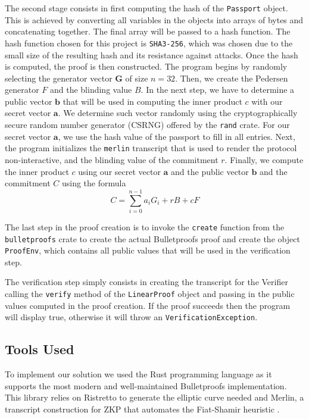 \documentclass[sigconf,screen,nonacm]{acmart}
\begin{document}
  The second stage consists in first computing the hash of the \texttt{Passport}
  object. This is achieved by converting all variables in the objects into arrays
  of bytes and concatenating together. The final array will be passed to a hash
  function. The hash function chosen for this project is \texttt{SHA3-256}, which
  was chosen due to the small size of the resulting hash and its resistance against
  attacks. Once the hash is computed, the proof is then constructed. The program
  begins by randomly selecting the generator vector $\mathbf{G}$ of size $n = 32$.
  Then, we create the Pedersen generator $F$ and the blinding value $B$. In the next
  step, we have to determine a public vector $\mathbf{b}$ that will be used in
  computing the inner product $c$ with our secret vector $\mathbf{a}$. We determine
  such vector randomly using the cryptographically secure random number generator
  (CSRNG) offered by the \texttt{rand} crate. For our secret vector $\mathbf{a}$,
  we use the hash value of the passport to fill in all entries. Next, the program
  initializes the \texttt{merlin} transcript that is used to render the protocol
  non-interactive, and the blinding value of the commitment $r$. Finally, we compute
  the inner product $c$ using our secret vector $\mathbf{a}$ and the public vector
  $\mathbf{b}$ and the commitment $C$ using the formula
  \begin{equation}
    C = \sum_{i=0}^{n-1} a_iG_i + rB + cF
  \end{equation}

  The last step in the proof creation is to invoke the \texttt{create} function
  from the \texttt{bulletproofs} crate to create the actual Bulletproofs proof
  and create the object \texttt{ProofEnv}, which contains all public values that
  will be used in the verification step.

  The verification step simply consists in creating the transcript for the Verifier
  calling the \texttt{verify} method of
  the \texttt{LinearProof} object and passing in the public values computed in the
  proof creation. If the proof succeeds then the program will display true, otherwise
  it will throw an \texttt{VerificationException}.

  \subsection{Tools Used}

  To implement our solution we used the Rust programming language as it supports
  the most modern and well-maintained Bulletproofs implementation. This library
  relies on Ristretto to generate the elliptic curve needed and Merlin,
  a transcript construction for ZKP that automates the Fiat-Shamir heuristic
  \cite{VYA18, VAL18}.
\end{document}
